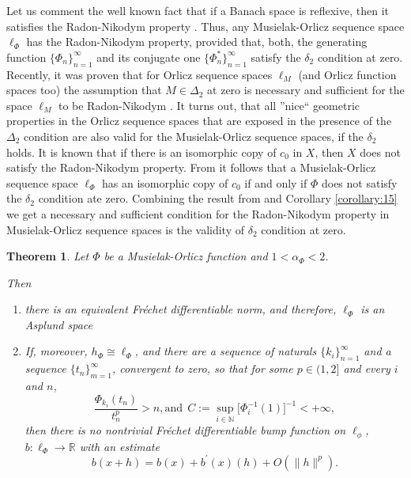 \documentclass[12pt]{article}
\theoremstyle{thmstyleone}%
\newtheorem{theorem}{Theorem}
\theoremstyle{thmstyletwo}%
\theoremstyle{thmstylethree}%
\begin{document}
{{Let us comment the well known fact that if a Banach space is reflexive, then it satisfies the Radon-Nikodym property \cite{Diestel1976RMJ}. Thus, any Musielak-Orlicz sequence space $\ell_{\Phi}$ has the Radon-Nikodym property, provided that, both, the generating function $\{\Phi_n\}_{n=1}^\infty$ and its conjugate one $\{\Phi_n^{*}\}_{n=1}^\infty$ satisfy the $\delta_2$ condition at zero. Recently, it was proven that for Orlicz sequence spaces $\ell_M$ (and Orlicz function spaces too) the assumption that $M\in\Delta_2$ at zero is necessary and sufficient for the space $\ell_M$ to be Radon-Nikodym \cite{KAMINSKA2020848}. It turns out, that all ''nice`` geometric properties in the Orlicz sequence spaces that are exposed in the presence of the $\Delta_2$ condition are also valid for the Musielak-Orlicz sequence spaces, if the $\delta_2$ holds. It is known that if there is an isomorphic copy of $c_0$ in $X$, then $X$ does not satisfy the Radon-Nikodym property. From \cite{Alherk1994} it follows that 
a Musielak-Orlicz sequence space $\ell_{\Phi}$ has an isomorphic copy of $c_0$ if and only if $\Phi$ does not satisfy the $\delta_2$ condition ate zero. Combining the result from \cite{Alherk1994} and Corollary \ref{corollary:15} we get a necessary and sufficient condition for the Radon-Nikodym property in Musielak-Orlicz sequence spaces is the validity of $\delta_2$ condition at zero.}

 
\begin{theorem}\label{theorem:17}
	Let $\Phi$ be a Musielak-Orlicz function and $1< \alpha_\Phi<2$. 
	
	Then
	\begin{enumerate}
		\item there is an equivalent Fr\'{e}chet differentiable norm, and therefore, $\ell_\Phi$ is an Asplund space 
		\item {If, moreover,  $h_\Phi\cong\ell_\Phi$,  and there are a sequence of naturals
			$\{k_i\}_{n=1}^\infty$ and a sequence $\{t_n\}_{m=1}^\infty$, convergent to zero, so that for some $p\in (1,2]$ and  every $i$ and $n$, 
			 \[ \displaystyle
  \frac{\Phi_{k_i}(t_n)}{t_n^p}>n, \mbox {and} \ \ 
  C:=\sup_{i\in \mathbb{N}}\Big [\Phi_i^{-1}(1)\Big ]^{-1} < +\infty, 
\] 
  then there is no nontrivial Fr\'{e}chet differentiable bump function on $\ell_\phi$, $b:\ell_\Phi\to\mathbb{R}$ with an estimate
		$$
		b(x+h)=b(x)+b^{\prime}(x)(h)+O(\|h\|^p).
		$$ 		
		}
\end{enumerate}

\end{theorem}

}
\end{document}

